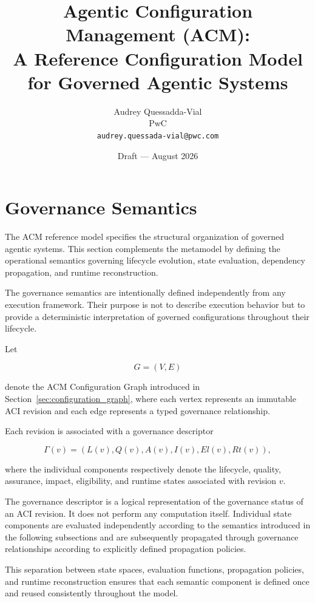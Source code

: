 \documentclass[10pt]{article}
\title{\textbf{Agentic Configuration Management (ACM):\\A Reference Configuration Model for Governed Agentic Systems}}
\author{
	Audrey Quessadda-Vial\\
	PwC\\
	\texttt{audrey.quessada-vial@pwc.com}
}
\date{Draft --- August 2026}
\begin{document}
	
	\maketitle
	
	
\section{Governance Semantics}
\label{sec:governance_semantics}
	
	The ACM reference model specifies the structural organization of governed agentic systems. This section complements the metamodel by defining the operational semantics governing lifecycle evolution, state evaluation, dependency propagation, and runtime reconstruction.
	
	The governance semantics are intentionally defined independently from any execution framework. Their purpose is not to describe execution behavior but to provide a deterministic interpretation of governed configurations throughout their lifecycle.
	
	Let
	
	\begin{equation}
		G=(V,E)
		\label{eq:configuration_graph}
	\end{equation}
	
	denote the ACM Configuration Graph introduced in Section~\ref{sec:configuration_graph}, where each vertex represents an immutable ACI revision and each edge represents a typed governance relationship.
	
	Each revision is associated with a governance descriptor
	
	\begin{equation}
		\Gamma(v)=
		\left(
		L(v),
		Q(v),
		A(v),
		I(v),
		El(v),
		Rt(v)
		\right),
		\label{eq:governance_descriptor}
	\end{equation}
	
	where the individual components respectively denote the lifecycle, quality, assurance, impact, eligibility, and runtime states associated with revision $v$.
	
	The governance descriptor is a logical representation of the governance status of an ACI revision. It does not perform any computation itself. Individual state components are evaluated independently according to the semantics introduced in the following subsections and are subsequently propagated through governance relationships according to explicitly defined propagation policies.
	
	This separation between state spaces, evaluation functions, propagation policies, and runtime reconstruction ensures that each semantic component is defined once and reused consistently throughout the model.
	
\end{document}
